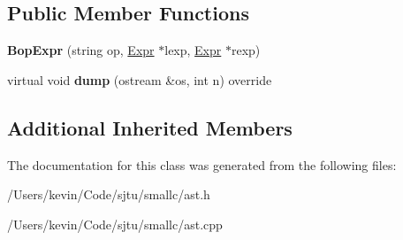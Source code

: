 \subsection*{Public Member Functions}
\begin{DoxyCompactItemize}
\item 
\mbox{\label{class_bop_expr_a40537ccaae3950e84002a3372fd3bec1}} 
{\bfseries Bop\+Expr} (string op, \hyperlink{class_expr}{Expr} $\ast$lexp, \hyperlink{class_expr}{Expr} $\ast$rexp)
\item 
\mbox{\label{class_bop_expr_a26c4b2aabc1e8c43e588b7aea75eee27}} 
virtual void {\bfseries dump} (ostream \&os, int n) override
\end{DoxyCompactItemize}
\subsection*{Additional Inherited Members}


The documentation for this class was generated from the following files\+:\begin{DoxyCompactItemize}
\item 
/\+Users/kevin/\+Code/sjtu/smallc/ast.\+h\item 
/\+Users/kevin/\+Code/sjtu/smallc/ast.\+cpp\end{DoxyCompactItemize}
